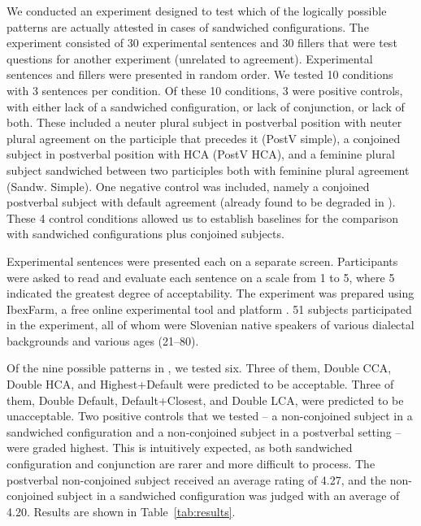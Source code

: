 \documentclass[output=paper
,modfonts
,nonflat]{langsci/langscibook}
\begin{document}
We conducted an experiment designed to test which of the logically possible patterns are actually attested in cases of sandwiched configurations. The experiment consisted of 30 experimental sentences and 30 fillers that were test questions for another experiment (unrelated to agreement). Experimental sentences and fillers were presented in random order. We tested 10 conditions with 3 sentences per condition. Of these 10 conditions, 3 were positive controls, with either lack of a sandwiched configuration, or lack of conjunction, or lack of both. These included a neuter plural subject in postverbal position with neuter plural agreement on the participle that precedes it (PostV simple), a conjoined subject in postverbal position with HCA (PostV HCA), and a feminine plural subject sandwiched between two participles both with feminine plural agreement (Sandw. Simple). One negative control was included, namely a conjoined postverbal subject with default agreement (already found to be degraded in \citealt{willergold:16}). These 4 control conditions allowed us to establish baselines for the comparison with sandwiched configurations plus conjoined subjects. 

Experimental sentences were presented each on a separate screen. Participants were asked to read and evaluate each sentence on a scale from 1 to 5, where 5 indicated the greatest degree of acceptability. The experiment was prepared using IbexFarm, a free online experimental tool and platform \citep{drummond:ibex}. 51 subjects participated in the experiment, all of whom were Slovenian native speakers of various dialectal backgrounds and various ages (21--80).

Of the nine possible patterns in , we tested six. Three of them, Double CCA, Double HCA, and Highest+Default were predicted to be acceptable. Three of them, Double Default, Default+Closest, and Double LCA, were predicted to be unacceptable. Two positive controls that we tested -- a non-conjoined subject in a sandwiched configuration and a non-conjoined subject in a postverbal setting -- were graded highest. This is intuitively expected, as both sandwiched configuration and conjunction are rarer and more difficult to process. The postverbal non-conjoined subject received an average rating of 4.27, and the non-conjoined subject in a sandwiched configuration was judged with an average of 4.20. Results are shown in Table~\ref{tab:results}.
\end{document}
